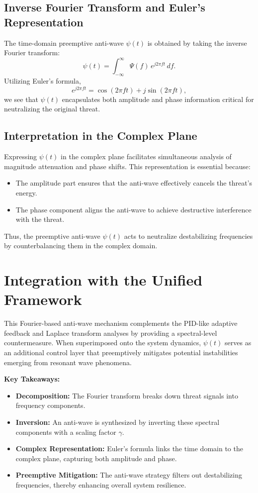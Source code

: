 \documentclass{article}
\theoremstyle{definition}
\begin{document}
\subsection{Inverse Fourier Transform and Euler's Representation}
The time-domain preemptive anti-wave $\psi(t)$ is obtained by taking the inverse Fourier transform:
\[
\psi(t) = \int_{-\infty}^{\infty} \Psi(f) \, e^{j 2\pi f t} \, df.
\]
Utilizing Euler's formula,
\[
e^{j 2\pi f t} = \cos(2\pi f t) + j \sin(2\pi f t),
\]
we see that $\psi(t)$ encapsulates both amplitude and phase information critical for neutralizing the original threat.

\subsection{Interpretation in the Complex Plane}
Expressing $\psi(t)$ in the complex plane facilitates simultaneous analysis of magnitude attenuation and phase shifts. This representation is essential because:
\begin{itemize}
    \item The amplitude part ensures that the anti-wave effectively cancels the threat's energy.
    \item The phase component aligns the anti-wave to achieve destructive interference with the threat.
\end{itemize}
Thus, the preemptive anti-wave $\psi(t)$ acts to neutralize destabilizing frequencies by counterbalancing them in the complex domain.

\section{Integration with the Unified Framework}
This Fourier-based anti-wave mechanism complements the PID-like adaptive feedback and Laplace transform analyses by providing a spectral-level countermeasure. When superimposed onto the system dynamics, $\psi(t)$ serves as an additional control layer that preemptively mitigates potential instabilities emerging from resonant wave phenomena.

\textbf{Key Takeaways:}
\begin{itemize}
    \item \textbf{Decomposition:} The Fourier transform breaks down threat signals into frequency components.
    \item \textbf{Inversion:} An anti-wave is synthesized by inverting these spectral components with a scaling factor $\gamma$.
    \item \textbf{Complex Representation:} Euler's formula links the time domain to the complex plane, capturing both amplitude and phase.
    \item \textbf{Preemptive Mitigation:} The anti-wave strategy filters out destabilizing frequencies, thereby enhancing overall system resilience.
\end{itemize}
\end{document}
